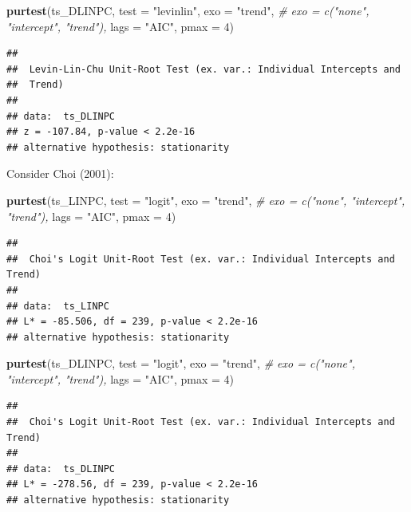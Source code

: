 \documentclass[
]{book}
\newenvironment{Shaded}{\begin{snugshade}}{\end{snugshade}}
\newcommand{\AttributeTok}[1]{\textcolor[rgb]{0.13,0.29,0.53}{#1}}
\newcommand{\CommentTok}[1]{\textcolor[rgb]{0.56,0.35,0.01}{\textit{#1}}}
\newcommand{\DecValTok}[1]{\textcolor[rgb]{0.00,0.00,0.81}{#1}}
\newcommand{\FunctionTok}[1]{\textcolor[rgb]{0.13,0.29,0.53}{\textbf{#1}}}
\newcommand{\NormalTok}[1]{#1}
\newcommand{\StringTok}[1]{\textcolor[rgb]{0.31,0.60,0.02}{#1}}
\begin{document}
\begin{Shaded}
\begin{Highlighting}[]
\FunctionTok{purtest}\NormalTok{(ts\_DLINPC, }\AttributeTok{test =} \StringTok{"levinlin"}\NormalTok{, }\AttributeTok{exo =} \StringTok{"trend"}\NormalTok{, }\CommentTok{\# exo = c("none", "intercept", "trend"),}
        \AttributeTok{lags =} \StringTok{"AIC"}\NormalTok{, }\AttributeTok{pmax =} \DecValTok{4}\NormalTok{)}
\end{Highlighting}
\end{Shaded}

\begin{verbatim}
## 
##  Levin-Lin-Chu Unit-Root Test (ex. var.: Individual Intercepts and
##  Trend)
## 
## data:  ts_DLINPC
## z = -107.84, p-value < 2.2e-16
## alternative hypothesis: stationarity
\end{verbatim}

Consider Choi (2001):

\begin{Shaded}
\begin{Highlighting}[]
\FunctionTok{purtest}\NormalTok{(ts\_LINPC, }\AttributeTok{test =} \StringTok{"logit"}\NormalTok{, }\AttributeTok{exo =} \StringTok{"trend"}\NormalTok{, }\CommentTok{\# exo = c("none", "intercept", "trend"),}
        \AttributeTok{lags =} \StringTok{"AIC"}\NormalTok{, }\AttributeTok{pmax =} \DecValTok{4}\NormalTok{)}
\end{Highlighting}
\end{Shaded}

\begin{verbatim}
## 
##  Choi's Logit Unit-Root Test (ex. var.: Individual Intercepts and Trend)
## 
## data:  ts_LINPC
## L* = -85.506, df = 239, p-value < 2.2e-16
## alternative hypothesis: stationarity
\end{verbatim}

\begin{Shaded}
\begin{Highlighting}[]
\FunctionTok{purtest}\NormalTok{(ts\_DLINPC, }\AttributeTok{test =} \StringTok{"logit"}\NormalTok{, }\AttributeTok{exo =} \StringTok{"trend"}\NormalTok{, }\CommentTok{\# exo = c("none", "intercept", "trend"),}
        \AttributeTok{lags =} \StringTok{"AIC"}\NormalTok{, }\AttributeTok{pmax =} \DecValTok{4}\NormalTok{)}
\end{Highlighting}
\end{Shaded}

\begin{verbatim}
## 
##  Choi's Logit Unit-Root Test (ex. var.: Individual Intercepts and Trend)
## 
## data:  ts_DLINPC
## L* = -278.56, df = 239, p-value < 2.2e-16
## alternative hypothesis: stationarity
\end{verbatim}
\end{document}
